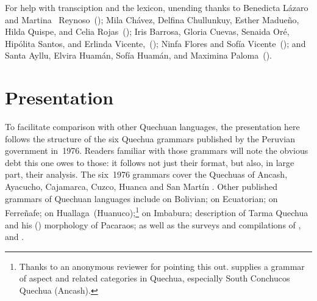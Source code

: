 For help with transciption and the lexicon, unending thanks to \foreignlanguage{spanish}{Benedicta L\'azaro} and Martina \ Reynoso~(\ACH{}); Mila Ch\'avez, Delfina Chullunkuy, \foreignlanguage{spanish}{Esther Madue\~no}, Hilda Quispe, and Celia Rojas~(\AMV{}); Iris Barrosa, Gloria Cuevas, Senaida Or\'e, Hip\'olita Santos, and Erlinda Vicente,~(\CH{}); Ninfa Flores and Sof\'ia Vicente~(\LT{}); and Santa Ayllu, Elvira Huam\'an, Sof\'ia Huam\'an, and Maximina Paloma~(\SP{}).

\section{Presentation}\label{sec:presentation}
To facilitate comparison with other Quechuan languages, the presentation here follows the structure of the six Quechua grammars published by the Peruvian government in~1976. Readers familiar with those grammars will note the obvious debt this one owes to those: it follows not just their format, but also, in large part, their analysis. The six~1976 grammars cover the Quechuas of Ancash, Ayacucho, Cajamarca, Cuzco, Huanca and San Mart\'in \citep{Parker76gram,Soto76a,Quesada76,Cusihuaman76,CerroP76a,Coombs76}. Other published grammars of Quechuan languages include \citet{Herrero78} on Bolivian; \citet{Catta94} on Ecuatorian; \citet{Taylor94a} on Ferre\~nafe; \citet{Weber89} on Huallaga~(Huanuco);\footnote{Thanks to an anonymous reviewer for pointing this out. \citet{Hintz} supplies a grammar of aspect and related categories in Quechua, especially South Conchucos Quechua (Ancash).} \citet{Cole82} on Imbabura; \citet{Adelaar77} description of Tarma Quechua and his (\citeyear{Adelaar86}) morphology of Pacaraos; 
as well as the surveys and compilations of \citet{CerroP87,CerroP90}, and \citet{Cole94}.

